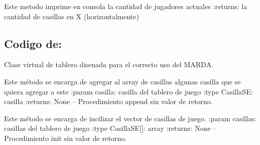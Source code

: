 \documentclass[letterpaper,10pt,english]{sphinxmanual}
\begin{document}
\begin{fulllineitems}
\begin{fulllineitems}
\label{\detokenize{codigo:singleton.Singleton.ver_jugadores}}
Este metodo imprime en consola la cantidad de jugadores actuales
:returns: la cantidad de casillas en X (horizontalmente)

\end{fulllineitems}


\end{fulllineitems}



\subsection{Codigo de: }
\label{\detokenize{codigo:module-tablero}}\label{\detokenize{codigo:codigo-de-tablero}}

\begin{fulllineitems}
\label{\detokenize{codigo:tablero.Tablero}}
Clase virtual de tablero disenada para el correcto uso del MARDA.

\begin{fulllineitems}
\label{\detokenize{codigo:tablero.Tablero.appendCasilla}}
Este método se encarga de agregar al array de casillas algunas casilla que se quiera agregar a este
:param casilla: casilla del tablero de juego
:type CasillaSE: casilla
:returns:  None -- Procedimiento append sin valor de retorno.

\end{fulllineitems}


\begin{fulllineitems}
\label{\detokenize{codigo:tablero.Tablero.initCasillas}}
Este método se encarga de incilizar el vector de casillas de juego.
:param casillas: casillas del tablero de juego
:type CasillaSE{[}{]}: array
:returns:  None -- Procedimiento init sin valor de retorno.

\end{fulllineitems}


\end{fulllineitems}
\end{document}
